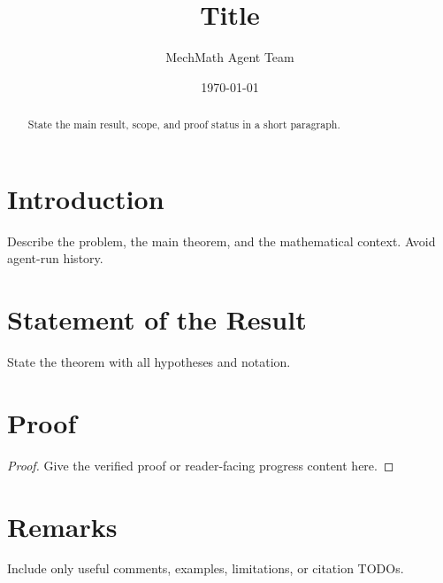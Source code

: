 \documentclass{article}
\title{Title}
\author{MechMath Agent Team}
\date{\today}
\begin{document}
\maketitle

\begin{abstract}
State the main result, scope, and proof status in a short paragraph.
\end{abstract}

\section{Introduction}

Describe the problem, the main theorem, and the mathematical context. Avoid
agent-run history.


\section{Statement of the Result}

\begin{theorem}
State the theorem with all hypotheses and notation.
\end{theorem}

\section{Proof}

\begin{proof}
Give the verified proof or reader-facing progress content here.
\end{proof}

\section{Remarks}

Include only useful comments, examples, limitations, or citation TODOs.



\end{document}
